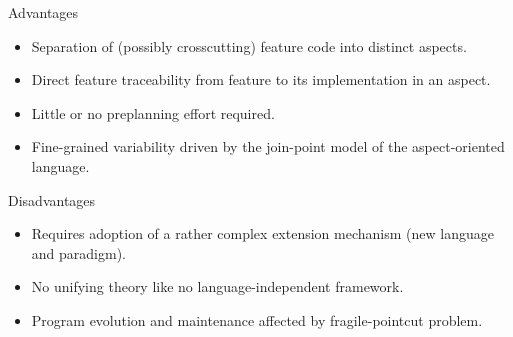 \begin{frame}{\myframetitle}
	\begin{mycolumns}[widths={50,50},animation=none]
		\begin{note}{Advantages}
			\begin{itemize}
				\item Separation of (possibly crosscutting) feature code into distinct aspects.
				\item Direct feature traceability from feature to its implementation in an aspect.
				\item Little or no preplanning effort required.
				\item Fine-grained variability driven by the join-point model of the aspect-oriented language.
			\end{itemize}
		\end{note}
	\mynextcolumn
		\pause
		\begin{note}{Disadvantages}
			\begin{itemize}
				\item Requires adoption of a rather complex extension mechanism (new language and paradigm).
				\item No unifying theory like no language-independent framework.
				\item Program evolution and maintenance affected by fragile-pointcut problem.
			\end{itemize}
		\end{note}
	\end{mycolumns}
\end{frame}


